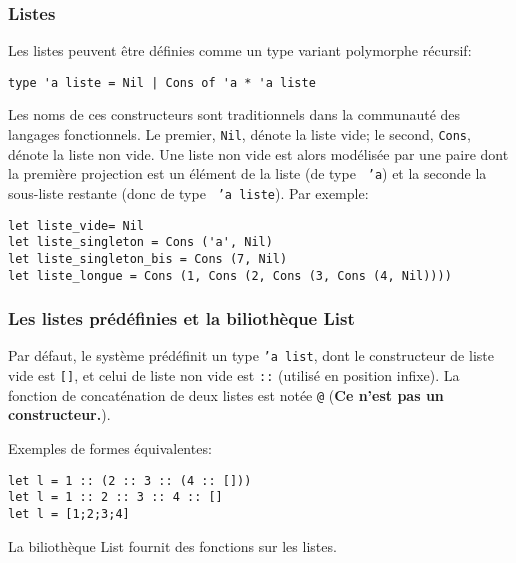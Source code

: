 
%
\begin{frame}[containsverbatim]
\frametitle{Listes}

Les listes peuvent être définies comme un type variant polymorphe
récursif:
{\small
\begin{verbatim}
type 'a liste = Nil | Cons of 'a * 'a liste
\end{verbatim}
}
Les noms de ces constructeurs sont traditionnels dans la communauté
des langages fonctionnels. Le premier, \texttt{\small Nil}, dénote la
liste vide; le second, \texttt{\small Cons}, dénote la liste non
vide. Une liste non vide est alors modélisée par une paire dont la
première projection est un élément de la liste (de type \texttt{\small
'a}) et la seconde la sous-liste restante (donc de type \texttt{\small
'a liste}). Par exemple:
{\small
\begin{verbatim}
let liste_vide= Nil
let liste_singleton = Cons ('a', Nil)
let liste_singleton_bis = Cons (7, Nil)
let liste_longue = Cons (1, Cons (2, Cons (3, Cons (4, Nil))))
\end{verbatim}
}

\end{frame}

%
\begin{frame}[containsverbatim]
\frametitle{Les listes prédéfinies et la biliothèque List}

Par défaut, le système prédéfinit un type \texttt{\small 'a list},
dont le constructeur de liste vide est \verb+[]+, et celui de liste
non vide est \verb+::+ (utilisé en position infixe). La fonction de
concaténation de deux listes est notée \verb+@+ (\textbf{Ce n'est pas
un constructeur.}).

\bigskip

Exemples de formes équivalentes:
{\small
\begin{verbatim}
let l = 1 :: (2 :: 3 :: (4 :: []))
let l = 1 :: 2 :: 3 :: 4 :: []
let l = [1;2;3;4]
\end{verbatim}
}

\bigskip

La biliothèque \textsf{List} fournit des fonctions sur les listes.

\end{frame}

